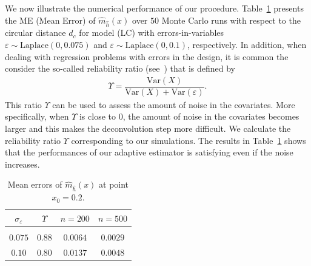 \documentclass[11pt,a4paper,openany]{article}
\newcommand{\Var}{\mbox{Var}}
\begin{document}
We now illustrate the numerical performance of our procedure. Table~\ref{numerical.results:table:MAE.linear-predictor} presents the ME (Mean Error) of $\widehat{m}_{\widehat{h}}(x)$ over $50$ Monte Carlo runs with respect to the circular distance $d_{c}$ for model (LC) with errors-in-variables $\varepsilon \sim \textrm{Laplace}(0, 0.075)$ and  $\varepsilon \sim \textrm{Laplace}(0, 0.1)$, respectively.  In addition, when dealing with regression problems with errors in the design, it is common the consider the so-called reliability ratio (see~\cite{Fan-Truong:1993}) that is defined by 
\begin{align} \label{reliability}
	\Upsilon = \dfrac{\Var(X)}{\Var(X) +  \Var(\varepsilon) }.  
\end{align}  
This ratio $\Upsilon$ can be used to assess the amount of noise in the covariates. More specifically, when  $\Upsilon$ is close to $0$, the amount of noise in the covariates becomes  larger and this makes the deconvolution step more difficult. We calculate the reliability ratio $\Upsilon$ corresponding to our  simulations.   
 The results in Table~\ref{numerical.results:table:MAE.linear-predictor} shows that the performances of our adaptive estimator is satisfying even if the noise increases. 
\begin{table}[ht!]  
	\begin{center}
		\begin{tabular}{c  c  || c  c }
			$\sigma_{\varepsilon}$ & $\Upsilon$    & $n = 200$ & $n = 500$ 
			\\[0.2cm]
			\hline  
			& &  
			\\[-0.2cm]   
			$0.075$ & $0.88$ &  $0.0064$ & $0.0029$ 
			\\[0.2cm]
			$0.10$ &$ 0.80$ &  $0.0137$  &  $0.0048$
		\end{tabular}
	\end{center} 
	\caption{Mean errors of $\widehat{m}_{\hat h}(x)$ at point $x_{0} = 0.2$.}
	\label{numerical.results:table:MAE.linear-predictor}
\end{table} 
\end{document}
